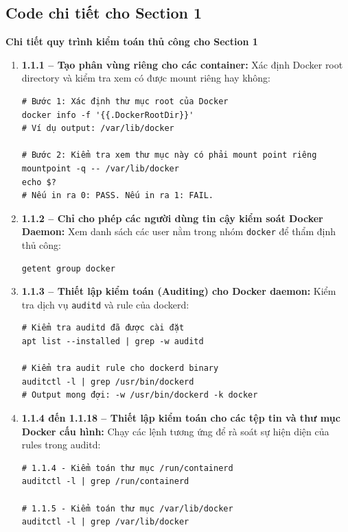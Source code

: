\subsection{Code chi tiết cho Section 1}\label{phu-luc-code-section-1}

\noindent\textbf{Chi tiết quy trình kiểm toán thủ công cho Section 1}

\begin{enumerate}
    \item \textbf{1.1.1 -- Tạo phân vùng riêng cho các container:}
    Xác định Docker root directory và kiểm tra xem có được mount riêng hay không:
{\footnotesize
\begin{verbatim}
# Bước 1: Xác định thư mục root của Docker
docker info -f '{{.DockerRootDir}}'
# Ví dụ output: /var/lib/docker

# Bước 2: Kiểm tra xem thư mục này có phải mount point riêng
mountpoint -q -- /var/lib/docker
echo $?
# Nếu in ra 0: PASS. Nếu in ra 1: FAIL.
\end{verbatim}
}

    \item \textbf{1.1.2 -- Chỉ cho phép các người dùng tin cậy kiểm soát Docker Daemon:}
    Xem danh sách các user nằm trong nhóm \texttt{docker} để thẩm định thủ công:
{\footnotesize
\begin{verbatim}
getent group docker
\end{verbatim}
}

    \item \textbf{1.1.3 -- Thiết lập kiểm toán (Auditing) cho Docker daemon:}
    Kiểm tra dịch vụ \texttt{auditd} và rule của dockerd:
{\footnotesize
\begin{verbatim}
# Kiểm tra auditd đã được cài đặt
apt list --installed | grep -w auditd

# Kiểm tra audit rule cho dockerd binary
auditctl -l | grep /usr/bin/dockerd
# Output mong đợi: -w /usr/bin/dockerd -k docker
\end{verbatim}
}

    \item \textbf{1.1.4 đến 1.1.18 -- Thiết lập kiểm toán cho các tệp tin và thư mục Docker cấu hình:}
    Chạy các lệnh tương ứng để rà soát sự hiện diện của rules trong auditd:
{\footnotesize
\begin{verbatim}
# 1.1.4 - Kiểm toán thư mục /run/containerd
auditctl -l | grep /run/containerd

# 1.1.5 - Kiểm toán thư mục /var/lib/docker
auditctl -l | grep /var/lib/docker


\end{verbatim}}
\end{enumerate}
